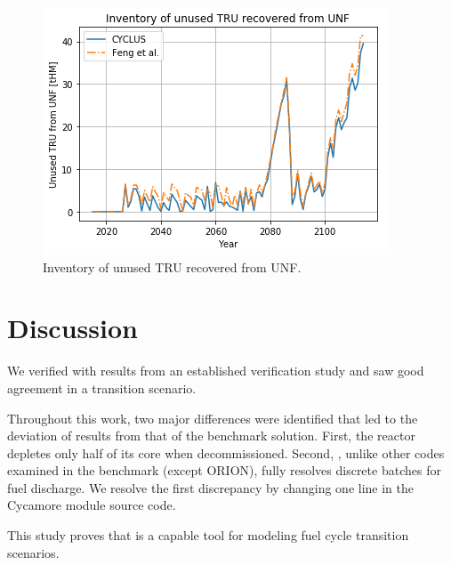 \begin{figure}[htbp!]
	\begin{center}
		\includegraphics[scale=0.7]{./images/results_18/tru.png}
	\end{center}
	\caption{Inventory of unused \gls{TRU} recovered from \gls{UNF}.}
	\label{fig:tru}
\end{figure}

\FloatBarrier

\section{Discussion}

We verified \Cyclus with results from an established
verification study and saw good agreement
in a transition scenario.

Throughout this work, two major differences were identified
that led to the deviation
of \Cyclus results from that of the benchmark solution. First,
the \Cycamore reactor depletes only half of its core
when decommissioned. Second, \Cyclus, unlike other
codes examined in the benchmark (except ORION), fully resolves
discrete batches for fuel discharge.
We resolve the first discrepancy by changing one line in the Cycamore module
source code.

This study proves that \Cyclus is a capable tool for modeling
fuel cycle transition scenarios.